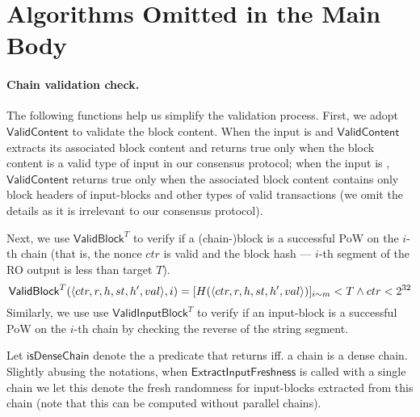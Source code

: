 \section{Algorithms Omitted in the Main Body}
\label{sec:algorithms-omitted}

\paragraph{Chain validation check.}
%
The following functions help us simplify the validation process.
%
First, we adopt $\mathsf{ValidContent}$ to validate the block content.
%
When the input is \IB and $\mathsf{ValidContent}$ extracts its associated block content and returns true only when the block content is a valid type of input in our consensus protocol; when the input is \block, $\mathsf{ValidContent}$ returns true only when the associated block content contains only block headers of input-blocks and other types of valid transactions (we omit the details as it is irrelevant to our consensus protocol).

Next, we use $\mathsf{ValidBlock}^T$ to verify if a (chain-)block is a successful PoW on the $i$-th chain (that is, the nonce $ctr$ is valid and the block hash --- $i$-th segment of the RO output is less than target $T$).
%
\[ \mathsf{ValidBlock}^T(\langle ctr, r, h, st, h', val \rangle,i) = [H(\langle ctr, r, h, st, h', val \rangle)]_{i\sim m} < T \wedge ctr < 2^{32} \]
%
Similarly, we use use $\mathsf{ValidInputBlock}^T$ to verify if an input-block is a successful PoW on the $i$-th chain by checking the reverse of the string segment.

Let $\mathsf{isDenseChain}$ denote the a predicate that returns \true iff. a chain \chain is a dense chain.
%
Slightly abusing the notations, when $\mathsf{ExtractInputFreshness}$ is called with a single chain \chain we let this denote the fresh randomness for input-blocks extracted from this chain (note that this can be computed without parallel chains).


